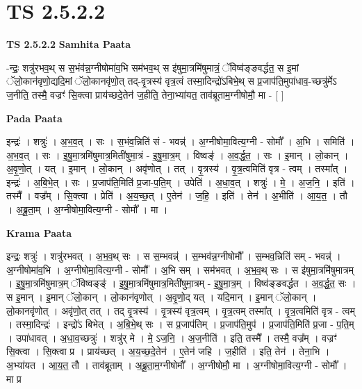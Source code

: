 \documentclass[17pt]{extarticle}
\begin{document}
\section*{ TS 2.5.2.2 }

\textbf{TS 2.5.2.2 } \newline
\textbf{Samhita Paata} \newline

-न्द्रः॒ शत्रु॑रभव॒थ् स स॒भंव॑न्न॒ग्नीषोमा॑व॒भि सम॑भव॒थ् स इ॑षुमा॒त्रमि॑षुमात्रं॒ ॅविष्व॑ङ्ङवर्द्धत॒ स इ॒मां ॅलो॒कान॑वृणो॒द्यदि॒मां ॅलो॒कानवृ॑णो॒त् तद्-वृ॒त्रस्य॑ वृत्र॒त्वं तस्मा॒दिन्द्रो॑ऽबिभे॒थ् स प्र॒जाप॑ति॒मुपा॑धाव॒-च्छत्रु॑र्मेऽ ज॒नीति॒ तस्मै॒ वज्रꣳ॑ सि॒क्त्वा प्राय॑च्छदे॒तेन॑ ज॒हीति॒ तेना॒भ्या॑यत॒ ताव॑ब्रूताम॒ग्नीषोमौ॒ मा - [  ] \newline

\textbf{Pada Paata} \newline

इन्द्रः॑ । शत्रुः॑ । अ॒भ॒व॒त् । सः । स॒भंव॒न्निति॑ सं - भवन्न्॑ । अ॒ग्नीषोमा॒वित्य॒ग्नी - सोमौ᳚ । अ॒भि । समिति॑ । अ॒भ॒व॒त् । सः । इ॒षु॒मा॒त्रमि॑षुमात्र॒मिती॑षुमा॒त्रं - इ॒षु॒मा॒त्र॒म् । विष्वङ्॑ । अ॒व॒र्द्ध॒त॒ । सः । इ॒मान् । लो॒कान् । अ॒वृ॒णो॒त् । यत् । इ॒मान् । लो॒कान् । अवृ॑णोत् । तत् । वृ॒त्रस्य॑ । वृ॒त्र॒त्वमिति॑ वृत्र - त्वम् । तस्मा᳚त् । इन्द्रः॑ । अ॒बि॒भे॒त् । सः । प्र॒जाप॑ति॒मिति॑ प्र॒जा-प॒ति॒म् । उपेति॑ । अ॒धा॒व॒त् । शत्रुः॑ । मे॒ । अ॒ज॒नि॒ । इति॑ । तस्मै᳚ । वज्र᳚म् । सि॒क्त्वा । प्रेति॑ । अ॒य॒च्छ॒त् । ए॒तेन॑ । ज॒हि॒ । इति॑ । तेन॑ । अ॒भीति॑ । आ॒य॒त॒ । तौ । अ॒ब्रू॒ता॒म् । अ॒ग्नीषोमा॒वित्य॒ग्नी - सोमौ᳚ । मा ।  \newline


\textbf{Krama Paata} \newline

इन्द्रः॒ शत्रुः॑ । शत्रु॑रभवत् । अ॒भ॒व॒थ् सः । स स॒म्भवन्न्॑ । स॒म्भव॑न्न॒ग्नीषोमौ᳚ । स॒म्भव॒न्निति॑ सम् - भवन्न्॑ । अ॒ग्नीषोमा॑व॒भि । अ॒ग्नीषोमा॒वित्य॒ग्नी - सोमौ᳚ । अ॒भि सम् । सम॑भवत् । अ॒भ॒व॒थ् सः । स इ॑षुमा॒त्रमि॑षुमात्रम् । इ॒षु॒मा॒त्रमि॑षुमात्र॒म् ॅविष्वङ्ङ्॑ । इ॒षु॒मा॒त्रमि॑षुमात्र॒मिती॑षुमा॒त्रम् - इ॒षु॒मा॒त्र॒म् । विष्व॑ङ्ङवर्द्धत । अ॒व॒र्द्ध॒त॒ सः । स इ॒मान् । इ॒मान् ॅलो॒कान् । लो॒कान॑वृणोत् । अ॒वृ॒णो॒द् यत् । यदि॒मान् । इ॒मान् ॅलो॒कान् । लो॒कानवृ॑णोत् । अवृ॑णो॒त् तत् । तद् वृ॒त्रस्य॑ । वृ॒त्रस्य॑ वृत्र॒त्वम् । वृ॒त्र॒त्वम् तस्मा᳚त् । वृ॒त्र॒त्वमिति॑ वृत्र - त्वम् । तस्मा॒दिन्द्रः॑ । इन्द्रो॑ऽ बिभेत् । अ॒बि॒भे॒थ् सः । स प्र॒जाप॑तिम् । प्र॒जाप॑ति॒मुप॑ । प्र॒जाप॑ति॒मिति॑ प्र॒जा - प॒ति॒म् । उपा॑धावत् । अ॒धा॒व॒च्छत्रुः॑ । शत्रु॑र् मे । मे॒ ऽज॒नि॒ । अ॒ज॒नीति॑ । इति॒ तस्मै᳚ । तस्मै॒ वज्र᳚म् । वज्रꣳ॑ सि॒क्त्वा । सि॒क्त्वा प्र । प्राय॑च्छत् । अ॒य॒च्छ॒दे॒तेन॑ । ए॒तेन॑ जहि । ज॒हीति॑ । इति॒ तेन॑ । तेना॒भि । अ॒भ्या॑यत । आ॒य॒त॒ तौ । ताव॑ब्रूताम् । अ॒ब्रू॒ता॒म॒ग्नीषोमौ᳚ । अ॒ग्नीषोमौ॒ मा । अ॒ग्नीषोमा॒वित्य॒ग्नी - सोमौ᳚ । मा प्र \newline
\end{document}
